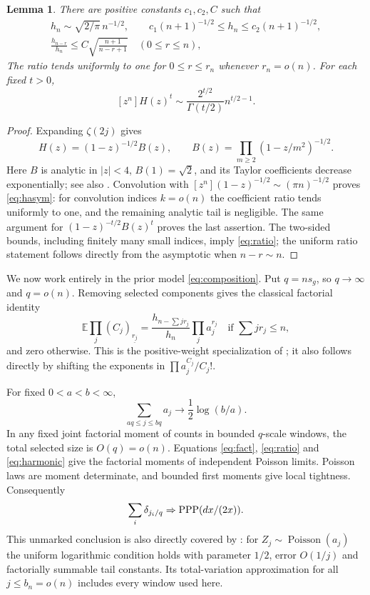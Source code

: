 \documentclass[11pt]{article}
\newtheorem{lemma}[theorem]{Lemma}
\theoremstyle{remark}\newtheorem{remark}[theorem]{Remark}
\newcommand{\E}{\mathbb E}\newcommand{\Prob}{\mathbb P}
\newcommand{\Poi}{\operatorname{Poisson}}\newcommand{\Gam}{\operatorname{Gamma}}
\newcommand{\fall}[2]{(#1)_{\underline{#2}}}
\begin{document}
\begin{lemma}\label{lem:coeff}
There are positive constants $c_1,c_2,C$ such that
\begin{gather}
 h_n\sim\sqrt{2/\pi}\,n^{-1/2},\qquad
 c_1(n+1)^{-1/2}\le h_n\le c_2(n+1)^{-1/2},\label{eq:hasym}\\
 \frac{h_{n-r}}{h_n}\le C\sqrt{\frac{n+1}{n-r+1}}\quad(0\le r\le n),\label{eq:ratio}
\end{gather}
The ratio tends uniformly to one for $0\le r\le r_n$ whenever $r_n=o(n)$. For each fixed $t>0$,
\[
 [z^n]H(z)^t\sim\frac{2^{t/2}}{\Gamma(t/2)}n^{t/2-1}.
\]
\end{lemma}
\begin{proof}
Expanding $\zeta(2j)$ gives
\[
 H(z)=(1-z)^{-1/2}B(z),\qquad
 B(z)=\prod_{m\ge2}(1-z/m^2)^{-1/2}.
\]
Here $B$ is analytic in $|z|<4$, $B(1)=\sqrt2$, and its Taylor coefficients decrease exponentially; see also \cite[Lemma 6.7]{DL}. Convolution with $[z^n](1-z)^{-1/2}\sim(\pi n)^{-1/2}$ proves \eqref{eq:hasym}: for convolution indices $k=o(n)$ the coefficient ratio tends uniformly to one, and the remaining analytic tail is negligible. The same argument for $(1-z)^{-t/2}B(z)^t$ proves the last assertion. The two-sided bounds, including finitely many small indices, imply \eqref{eq:ratio}; the uniform ratio statement follows directly from the asymptotic when $n-r\sim n$.
\end{proof}

We now work entirely in the prior model \eqref{eq:composition}. Put $q=ns_g$, so $q\to\infty$ and $q=o(n)$. Removing selected components gives the classical factorial identity
\begin{equation}\label{eq:fact}
 \E\prod_j\fall{C_j}{r_j}
 =\frac{h_{n-\sum jr_j}}{h_n}\prod_j a_j^{r_j}
 \quad\text{if }\sum jr_j\le n,
\end{equation}
and zero otherwise. This is the positive-weight specialization of \cite[Lemma 5, (126)]{AT}; it also follows directly by shifting the exponents in $\prod a_j^{C_j}/C_j!$.

For fixed $0<a<b<\infty$,
\begin{equation}\label{eq:harmonic}
 \sum_{aq\le j\le bq}a_j\longrightarrow\frac12\log(b/a).
\end{equation}
In any fixed joint factorial moment of counts in bounded $q$-scale windows, the total selected size is $O(q)=o(n)$. Equations \eqref{eq:fact}, \eqref{eq:ratio} and \eqref{eq:harmonic} give the factorial moments of independent Poisson limits. Poisson laws are moment determinate, and bounded first moments give local tightness. Consequently
\begin{equation}\label{eq:unmarked}
 \sum_i\delta_{j_i/q}\Rightarrow\operatorname{PPP}(dx/(2x)).
\end{equation}
This unmarked conclusion is also directly covered by \cite[Theorem 3.1]{ABT}: for $Z_j\sim\Poi(a_j)$ the uniform logarithmic condition holds with parameter $1/2$, error $O(1/j)$ and factorially summable tail constants. Its total-variation approximation for all $j\le b_n=o(n)$ includes every window used here.
\end{document}
